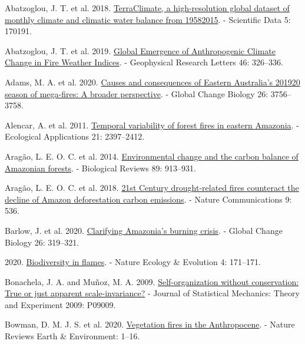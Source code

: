 \documentclass[
]{article}
\newlength{\cslhangindent}
\newenvironment{CSLReferences}[2] %
 {\begin{list}{}{%
  \setlength{\itemindent}{0pt}
  \setlength{\leftmargin}{0pt}
  \setlength{\parsep}{0pt}
  \ifodd #1
   \setlength{\leftmargin}{\cslhangindent}
   \setlength{\itemindent}{-1\cslhangindent}
  \fi
  \setlength{\itemsep}{#2\baselineskip}}}
 {\end{list}}
\begin{document}
\label{refs}
\begin{CSLReferences}{1}{1}
Abatzoglou, J. T. et al. 2018.
\href{https://doi.org/10.1038/sdata.2017.191}{{TerraClimate}, a
high-resolution global dataset of monthly climate and climatic water
balance from 1958{\textendash}2015}. - Scientific Data 5: 170191.

Abatzoglou, J. T. et al. 2019.
\href{https://doi.org/10.1029/2018GL080959}{Global {Emergence} of
{Anthropogenic Climate Change} in {Fire Weather Indices}}. - Geophysical
Research Letters 46: 326--336.

Adams, M. A. et al. 2020.
\href{https://doi.org/10.1111/gcb.15125}{Causes and consequences of
{Eastern Australia}'s 2019{\textendash}20 season of mega-fires: {A}
broader perspective}. - Global Change Biology 26: 3756--3758.

Alencar, A. et al. 2011.
\href{https://doi.org/10.1890/10-1168.1}{Temporal variability of forest
fires in eastern {Amazonia}}. - Ecological Applications 21: 2397--2412.

Aragão, L. E. O. C. et al. 2014.
\href{https://doi.org/10.1111/brv.12088}{Environmental change and the
carbon balance of {Amazonian} forests}. - Biological Reviews 89:
913--931.

Aragão, L. E. O. C. et al. 2018.
\href{https://doi.org/10.1038/s41467-017-02771-y}{21st {Century}
drought-related fires counteract the decline of {Amazon} deforestation
carbon emissions}. - Nature Communications 9: 536.

Barlow, J. et al. 2020.
\href{https://doi.org/10.1111/gcb.14872}{Clarifying {Amazonia}'s burning
crisis}. - Global Change Biology 26: 319--321.

2020. \href{https://doi.org/10.1038/s41559-020-1119-4}{Biodiversity in
flames}. - Nature Ecology \& Evolution 4: 171--171.

Bonachela, J. A. and Muñoz, M. A. 2009.
\href{https://doi.org/10.1088/1742-5468/2009/09/P09009}{Self-organization
without conservation: True or just apparent scale-invariance?} - Journal
of Statistical Mechanics: Theory and Experiment 2009: P09009.

Bowman, D. M. J. S. et al. 2020.
\href{https://doi.org/10.1038/s43017-020-0085-3}{Vegetation fires in the
{Anthropocene}}. - Nature Reviews Earth \& Environment: 1--16.


\end{CSLReferences}
\end{document}
